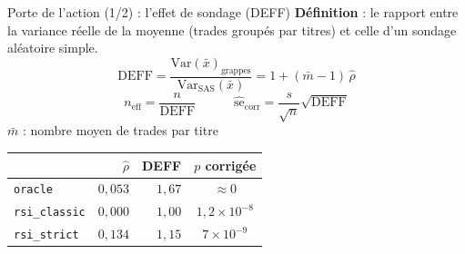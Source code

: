 \documentclass[10pt]{beamer}
\begin{document}
\begin{frame}{Porte de l'action (1/2) : l'effet de sondage (DEFF)}
  \textbf{Définition} : le rapport entre la variance réelle de la moyenne
  (trades groupés par titres) et celle d'un sondage aléatoire simple.
  \[
    \mathrm{DEFF}
      = \frac{\mathrm{Var}(\bar x)_{\text{grappes}}}
             {\mathrm{Var}_{\mathrm{SAS}}(\bar x)}
      = 1 + (\bar m - 1)\,\hat\rho
  \]
  \[
    n_{\mathrm{eff}} = \frac{n}{\mathrm{DEFF}}
    \qquad\quad
    \widehat{\mathrm{se}}_{\mathrm{corr}} = \frac{s}{\sqrt n}\sqrt{\mathrm{DEFF}}
  \]
  {\footnotesize $\bar m$ : nombre moyen de trades par titre}
  \vspace{3mm}
  \begin{center}
  \footnotesize
  \begin{tabular}{@{}lrrc@{}}
    \toprule
    & $\hat\rho$ & DEFF & $p$ corrigée \\
    \midrule
    \texttt{oracle}       & $0{,}053$ & $1{,}67$ & $\approx 0$ \\
    \texttt{rsi\_classic} & $0{,}000$ & $1{,}00$ & $1{,}2\times10^{-8}$ \\
    \texttt{rsi\_strict}  & $0{,}134$ & $1{,}15$ & $7\times10^{-9}$ \\
    \bottomrule
  \end{tabular}
  \end{center}
\end{frame}
\end{document}
